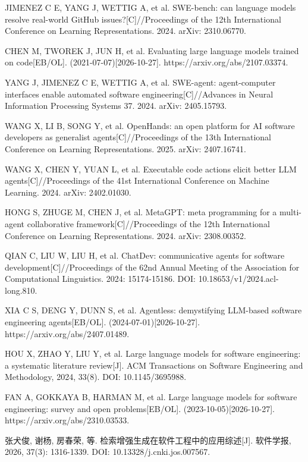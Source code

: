 {\linespread{1}\selectfont\raggedright
\begin{tjreflist}
\item JIMENEZ C E, YANG J, WETTIG A, et al. SWE-bench: can language models resolve real-world GitHub issues?[C]//Proceedings of the 12th International Conference on Learning Representations. 2024. arXiv: 2310.06770.
\item CHEN M, TWOREK J, JUN H, et al. Evaluating large language models trained on code[EB/OL]. (2021-07-07)[2026-10-27]. https://arxiv.org/abs/2107.03374.
\item YANG J, JIMENEZ C E, WETTIG A, et al. SWE-agent: agent-computer interfaces enable automated software engineering[C]//Advances in Neural Information Processing Systems 37. 2024. arXiv: 2405.15793.
\item WANG X, LI B, SONG Y, et al. OpenHands: an open platform for AI software developers as generalist agents[C]//Proceedings of the 13th International Conference on Learning Representations. 2025. arXiv: 2407.16741.
\item WANG X, CHEN Y, YUAN L, et al. Executable code actions elicit better LLM agents[C]//Proceedings of the 41st International Conference on Machine Learning. 2024. arXiv: 2402.01030.
\item HONG S, ZHUGE M, CHEN J, et al. MetaGPT: meta programming for a multi-agent collaborative framework[C]//Proceedings of the 12th International Conference on Learning Representations. 2024. arXiv: 2308.00352.
\item QIAN C, LIU W, LIU H, et al. ChatDev: communicative agents for software development[C]//Proceedings of the 62nd Annual Meeting of the Association for Computational Linguistics. 2024: 15174-15186. DOI: 10.18653/v1/2024.acl-long.810.
\item XIA C S, DENG Y, DUNN S, et al. Agentless: demystifying LLM-based software engineering agents[EB/OL]. (2024-07-01)[2026-10-27]. https://arxiv.org/abs/2407.01489.
\item HOU X, ZHAO Y, LIU Y, et al. Large language models for software engineering: a systematic literature review[J]. ACM Transactions on Software Engineering and Methodology, 2024, 33(8). DOI: 10.1145/3695988.
\item FAN A, GOKKAYA B, HARMAN M, et al. Large language models for software engineering: survey and open problems[EB/OL]. (2023-10-05)[2026-10-27]. https://arxiv.org/abs/2310.03533.
\item 张犬俊, 谢杨, 房春荣, 等. 检索增强生成在软件工程中的应用综述[J]. 软件学报, 2026, 37(3): 1316-1339. DOI: 10.13328/j.cnki.jos.007567.

\end{tjreflist}}
